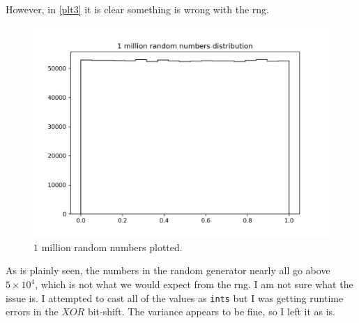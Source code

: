 However, in \autoref{plt3} it is clear something is wrong with the rng.
\begin{figure}[h!]
    \centering
    \includegraphics[width=0.9\linewidth]{./plots/1mil_hist.png}
    \caption{$1$ million random numbers plotted.}
    \label{plt3}
\end{figure}
As is plainly seen, the numbers in the random generator nearly all go above 
$5 \times 10^4$, which is not what we would expect from the rng. I am not
sure what the issue is. I attempted to cast all of the values as \texttt{ints}
but I was getting runtime errors in the $XOR$ bit-shift. The variance appears
to be fine, so I left it as is.
